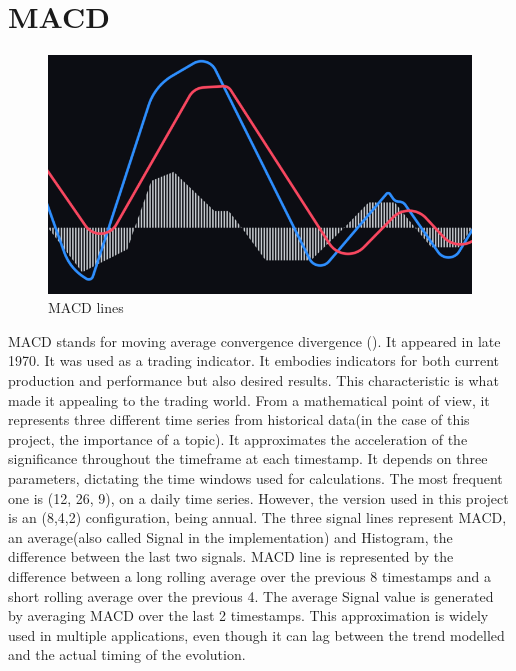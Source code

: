 \documentclass[12pt,MSc,a4paper,oneside]{muthesis}
\begin{document}
\section{MACD}

\begin{figure}[h]
    \centering
    \includegraphics[scale=0.55]{images/abstract/MACD Bin.png}
    \caption{MACD lines}
\end{figure}

MACD stands for moving average convergence divergence (\cite{wiki:macd}). It appeared in late 1970. It was used as a trading indicator. It embodies indicators for both current production and performance but also desired results. This characteristic is what made it appealing to the trading world. From a mathematical point of view, it represents three different time series from historical data(in the case of this project, the importance of a topic). It approximates the acceleration of the significance throughout the timeframe at each timestamp. It depends on three parameters, dictating the time windows used for calculations. The most frequent one is (12, 26, 9), on a daily time series. However, the version used in this project is an (8,4,2) configuration, being annual. The three signal lines represent MACD, an average(also called Signal in the implementation) and Histogram, the difference between the last two signals. MACD line is represented by the difference between a long rolling average over the previous 8 timestamps and a short rolling average over the previous 4. The average Signal value is generated by averaging MACD over the last 2 timestamps.
This approximation is widely used in multiple applications, even though it can lag between the trend modelled and the actual timing of the evolution.
\end{document}
